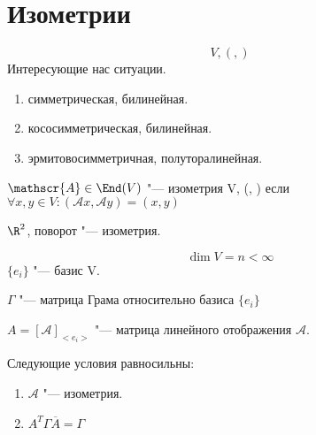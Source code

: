 \section{Изометрии}
$$V, (, )$$
Интересующие нас ситуации. 

\begin{enumerate}
    \item симметрическая, билинейная. 
    \item кососимметрическая, билинейная. 
    \item эрмитовосимметричная, полуторалинейная. 
\end{enumerate}

\begin{Def}
$\mathscr{A} \in \End(V)$ "--- изометрия V, (, )
если $\forall x, y \in V \colon (\mathscr{A}x, \mathscr{A}y) = (x, y)$
\end{Def}

\begin{exmp}

$\R^2$, поворот "--- изометрия. 

\end{exmp}

\begin{theorem}
$$\dim V = n < \infty$$
$\{e_i\} $ "--- базис V.

$\Gamma$ "--- матрица Грама относительно базиса $\{e_i\}$

$A = [\mathscr{A}]_{<e_i>}$ "--- матрица линейного отображения $\mathscr{A}$.

Следующие условия равносильны:
\begin{enumerate}
    \item $\mathscr{A}$ "--- изометрия.
    \item $A^T\Gamma\overline{A} = \Gamma$
\end{enumerate}
\end{theorem}

